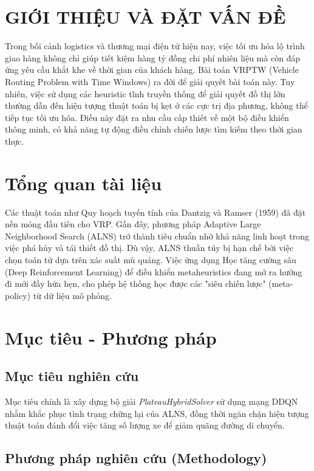 \documentclass[13pt, a4paper]{extarticle} %
\begin{document}
\section*{GIỚI THIỆU VÀ ĐẶT VẤN ĐỀ}
Trong bối cảnh logistics và thương mại điện tử hiện nay, việc tối ưu hóa lộ trình giao hàng không chỉ giúp tiết kiệm hàng tỷ đồng chi phí nhiên liệu mà còn đáp ứng yêu cầu khắt khe về thời gian của khách hàng. Bài toán VRPTW (Vehicle Routing Problem with Time Windows) ra đời để giải quyết bài toán này. Tuy nhiên, việc sử dụng các heuristic tĩnh truyền thống để giải quyết đồ thị lớn thường dẫn đến hiện tượng thuật toán bị kẹt ở các cực trị địa phương, không thể tiếp tục tối ưu hóa. Điều này đặt ra nhu cầu cấp thiết về một bộ điều khiển thông minh, có khả năng tự động điều chỉnh chiến lược tìm kiếm theo thời gian thực.
\newpage


\section{Tổng quan tài liệu}
Các thuật toán như Quy hoạch tuyến tính của Dantzig và Ramser (1959) đã đặt nền móng đầu tiên cho VRP. Gần đây, phương pháp Adaptive Large Neighborhood Search (ALNS) trở thành tiêu chuẩn nhờ khả năng linh hoạt trong việc phá hủy và tái thiết đồ thị. Dù vậy, ALNS thuần túy bị hạn chế bởi việc chọn toán tử dựa trên xác suất mù quáng. Việc ứng dụng Học tăng cường sâu (Deep Reinforcement Learning) để điều khiển metaheuristics \citep{Author2023} đang mở ra hướng đi mới đầy hứa hẹn, cho phép hệ thống học được các "siêu chiến lược" (meta-policy) từ dữ liệu mô phỏng.

\section{Mục tiêu - Phương pháp}

\subsection{Mục tiêu nghiên cứu}
Mục tiêu chính là xây dựng bộ giải \textit{PlateauHybridSolver} sử dụng mạng DDQN nhằm khắc phục tình trạng chững lại của ALNS, đồng thời ngăn chặn hiện tượng thuật toán đánh đổi việc tăng số lượng xe để giảm quãng đường di chuyển.

\subsection{Phương pháp nghiên cứu (Methodology)}
\end{document}
